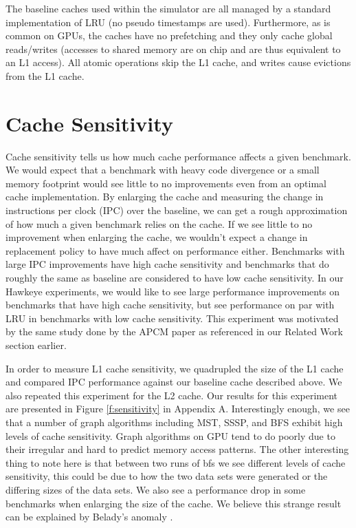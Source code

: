 The baseline caches used within the simulator are all managed by a standard implementation of LRU (no pseudo timestamps are used). Furthermore, as is common on GPUs, the caches have no prefetching and they only cache global reads/writes (accesses to shared memory are on chip and are thus equivalent to an L1 access). All atomic operations skip the L1 cache, and writes cause evictions from the L1 cache.

\section{Cache Sensitivity}
Cache sensitivity tells us how much cache performance affects a given benchmark. We would expect that a benchmark with heavy code divergence or a small memory footprint would see little to no improvements even from an optimal cache implementation. By enlarging the cache and measuring the change in instructions per clock (IPC) over the baseline, we can get a rough approximation of how much a given benchmark relies on the cache. If we see little to no improvement when enlarging the cache, we wouldn't expect a change in replacement policy to have much affect on performance either. Benchmarks with large IPC improvements have high cache sensitivity and benchmarks that do roughly the same as baseline are considered to have low cache sensitivity. In our Hawkeye experiments, we would like to see large performance improvements on benchmarks that have high cache sensitivity, but see performance on par with LRU in benchmarks with low cache sensitivity. This experiment was motivated by the same study done by the APCM paper as referenced in our Related Work section earlier.

In order to measure L1 cache sensitivity, we quadrupled the size of the L1 cache and compared IPC performance against our baseline cache described above. We also repeated this experiment for the L2 cache. Our results for this experiment are presented in Figure \ref{f:sensitivity} in Appendix A. Interestingly enough, we see that a number of graph algorithms including MST, SSSP, and BFS exhibit high levels of cache sensitivity. Graph algorithms on GPU tend to do poorly due to their irregular and hard to predict memory access patterns. The other interesting thing to note here is that between two runs of bfs we see different levels of cache sensitivity, this could be due to how the two data sets were generated or the differing sizes of the data sets. We also see a performance drop in some benchmarks when enlarging the size of the cache. We believe this strange result can be explained by Belady’s anomaly \cite{belady_anomaly}.

